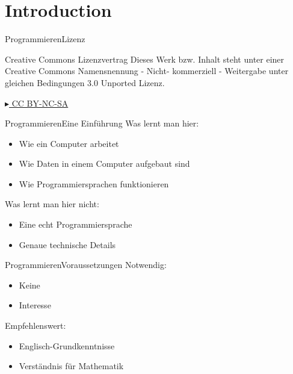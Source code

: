 


\section{Introduction}

\begin{frame}{Programmieren}{Lizenz}

	\begin{block}{Creative Commons Lizenzvertrag}
     Dieses Werk bzw. Inhalt steht unter einer Creative Commons Namensnennung - Nicht-	kommerziell - Weitergabe unter gleichen Bedingungen 3.0 Unported Lizenz.
	\end{block}
	\begin{center}
	\href{http://creativecommons.org/licenses/by-nc-sa/3.0/deed.de}{$\blacktriangleright$ CC BY-NC-SA}
	\end{center}
\end{frame}


\begin{frame}{Programmieren}{Eine Einführung}
	Was lernt man hier:
	\begin{itemize}
	\item Wie ein Computer arbeitet
	\item Wie Daten in einem Computer aufgebaut sind
	\item Wie Programmiersprachen funktionieren
	\end{itemize}
	\vspace*{0.3cm}
	
	Was lernt man hier nicht:
	\begin{itemize}
	\item Eine echt Programmiersprache
	\item Genaue technische Details
	\end{itemize}
\end{frame}


\begin{frame}{Programmieren}{Voraussetzungen}
	Notwendig:
	\begin{itemize}
	\item Keine
	\item Interesse
	\end{itemize}
	\vspace*{0.3cm}
	
	Empfehlenswert:
	\begin{itemize}
	\item Englisch-Grundkenntnisse
	\item Verständnis für Mathematik
	\end{itemize}
\end{frame}

